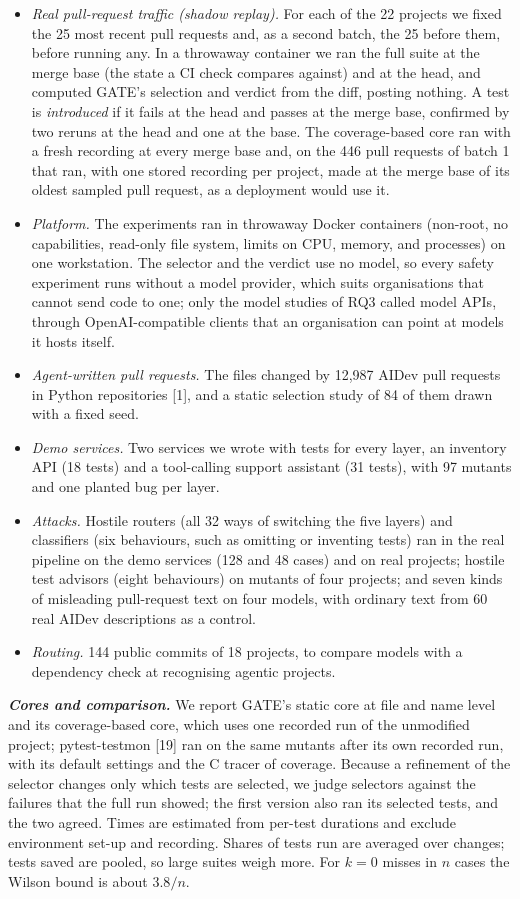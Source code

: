 \documentclass[conference]{IEEEtran}
\begin{document}
\begin{itemize}
\item
  \emph{Real pull-request traffic (shadow replay).} For each of the 22 projects we fixed the 25 most recent pull requests and, as a second batch, the 25 before them, before running any. In a throwaway container we ran the full suite at the merge base (the state a CI check compares against) and at the head, and computed GATE's selection and verdict from the diff, posting nothing. A test is \emph{introduced} if it fails at the head and passes at the merge base, confirmed by two reruns at the head and one at the base. The coverage-based core ran with a fresh recording at every merge base and, on the 446 pull requests of batch 1 that ran, with one stored recording per project, made at the merge base of its oldest sampled pull request, as a deployment would use it.
\item
  \emph{Platform.} The experiments ran in throwaway Docker containers (non-root, no capabilities, read-only file system, limits on CPU, memory, and processes) on one workstation. The selector and the verdict use no model, so every safety experiment runs without a model provider, which suits organisations that cannot send code to one; only the model studies of RQ3 called model APIs, through OpenAI-compatible clients that an organisation can point at models it hosts itself.
\item
  \emph{Agent-written pull requests.} The files changed by 12,987 AIDev pull requests in Python repositories {[}1{]}, and a static selection study of 84 of them drawn with a fixed seed.
\item
  \emph{Demo services.} Two services we wrote with tests for every layer, an inventory API (18 tests) and a tool-calling support assistant (31 tests), with 97 mutants and one planted bug per layer.
\item
  \emph{Attacks.} Hostile routers (all 32 ways of switching the five layers) and classifiers (six behaviours, such as omitting or inventing tests) ran in the real pipeline on the demo services (128 and 48 cases) and on real projects; hostile test advisors (eight behaviours) on mutants of four projects; and seven kinds of misleading pull-request text on four models, with ordinary text from 60 real AIDev descriptions as a control.
\item
  \emph{Routing.} 144 public commits of 18 projects, to compare models with a dependency check at recognising agentic projects.
\end{itemize}

\textbf{\emph{Cores and comparison.}} We report GATE's static core at file and name level and its coverage-based core, which uses one recorded run of the unmodified project; pytest-testmon {[}19{]} ran on the same mutants after its own recorded run, with its default settings and the C tracer of coverage. Because a refinement of the selector changes only which tests are selected, we judge selectors against the failures that the full run showed; the first version also ran its selected tests, and the two agreed. Times are estimated from per-test durations and exclude environment set-up and recording. Shares of tests run are averaged over changes; tests saved are pooled, so large suites weigh more. For \(k = 0\) misses in \(n\) cases the Wilson bound is about \(3.8/n\).
\end{document}
